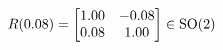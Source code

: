 \documentclass[preview]{standalone}
\begin{document}
\begin{align*}
\special{dvisvgm:raw <g id='unique000'>}R(0.08) = \begin{bmatrix} 1.00 & -0.08 \\ 0.08 & 1.00 \end{bmatrix} \in \text{SO}(2)\special{dvisvgm:raw </g>}
\end{align*}
\end{document}
